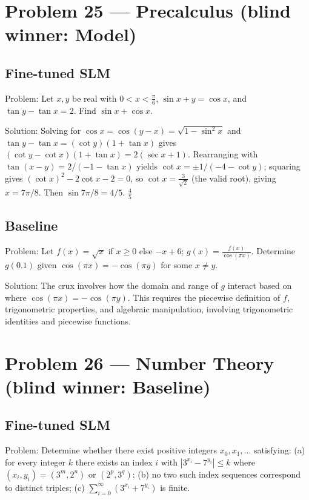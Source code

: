 \documentclass[11pt]{article}
\begin{document}
\section*{Problem 25 --- Precalculus \quad(blind winner: Model)}

\subsection*{Fine-tuned SLM}

Problem:
Let $x,y$ be real with $0<x<\frac{\pi}{6}$, $\sin x+y=\cos x$, and $\tan y-\tan x=2$. Find $\sin x+\cos x$.

Solution:
Solving for $\cos x=\cos(y-x)=\sqrt{1-\sin^2 x}$ and $\tan y-\tan x=(\cot y)(1+\tan x)$ gives $(\cot y-\cot x)(1+\tan x)=2(\sec x+1)$. Rearranging with $\tan(x-y)=2/(-1-\tan x)$ yields $\cot x=\pm 1/(-4-\cot y)$; squaring gives $(\cot x)^2-2\cot x-2=0$, so $\cot x=\frac3{\sqrt2}$ (the valid root), giving $x=7\pi/8$. Then $\sin 7\pi/8=4/5$. $\boxed{\frac45}$

\subsection*{Baseline}

Problem:
Let $f(x) = \sqrt{x}$ if $x \geq 0$ else $-x+6$; $g(x) = \frac{f(x)}{\cos(\pi x)}$. Determine $g(0.1)$ given $\cos(\pi x) = -\cos(\pi y)$ for some $x \neq y$.

Solution:
The crux involves how the domain and range of $g$ interact based on where $\cos(\pi x) = -\cos(\pi y)$. This requires the piecewise definition of $f$, trigonometric properties, and algebraic manipulation, involving trigonometric identities and piecewise functions.

\section*{Problem 26 --- Number Theory \quad(blind winner: Baseline)}

\subsection*{Fine-tuned SLM}

Problem:
Determine whether there exist positive integers $x_0, x_1, \ldots$ satisfying: (a) for every integer $k$ there exists an index $i$ with $|3^{x_i}-7^{y_i}|\le k$ where $(x_i,y_i)=(3^m,2^n)$ or $(2^p,3^q)$; (b) no two such index sequences correspond to distinct triples; (c) $\sum_{i=0}^{\infty}(3^{x_i}+7^{y_i})$ is finite.
\end{document}
